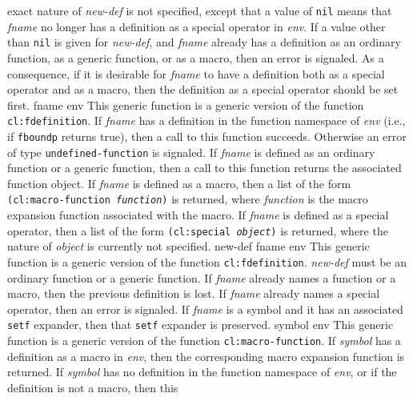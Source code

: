 exact nature of \textit{new-def} is not specified, except that a value
of \texttt{nil} means that \textit{fname} no longer has a definition
as a special operator in \textit{env}.
\vskip -0.02cm
If a value other than \texttt{nil} is given for \textit{new-def}, and
\textit{fname} already has a definition as an ordinary function, as a
generic function, or as a macro, then an error is signaled.  As a
consequence, if it is desirable for \textit{fname} to have a
definition both as a special operator and as a macro, then the
definition as a special operator should be set first.
\vskip -0.02cm
 {fname env}
\vskip -0.2cm
This generic function is a generic version of the \commonlisp{}
function \texttt{cl:fdefinition}.
\vskip -0.02cm
If \textit{fname} has a definition in the function namespace of
\textit{env} (i.e., if \texttt{fboundp} returns true), then a call to
this function succeeds.  Otherwise an error of type
\texttt{undefined-function} is signaled.
\vskip -0.02cm
If \textit{fname} is defined as an ordinary function or a generic
function, then a call to this function returns the associated
function object.
\vskip -0.02cm
If \textit{fname} is defined as a macro, then a list of the form
\texttt{(cl:macro-function \textrm{\textit{function}})} is returned, where
\textit{function} is the macro expansion function associated with the
macro.
\vskip -0.02cm
If \textit{fname} is defined as a special operator, then a list of the
form \texttt{(cl:special \textrm{\textit{object}})} is returned, where
  the nature of \textit{object} is currently not specified.
\vskip -0.02cm
 {new-def fname env}
\vskip -0.2cm
This generic function is a generic version of the \commonlisp{}
function \texttt{cl:fdefinition}.
\vskip -0.02cm
\textit{new-def} must be an ordinary function or a generic function.
If \textit{fname} already names a function or a macro, then the
previous definition is lost.  If \textit{fname} already names a
special operator, then an error is signaled.
\vskip -0.02cm
If \textit{fname} is a symbol and it has an associated \texttt{setf}
expander, then that \texttt{setf} expander is preserved.
\vskip -0.02cm
 {symbol env}
\vskip -0.2cm
This generic function is a generic version of the \commonlisp{}
function \texttt{cl:macro-function}.
\vskip -0.02cm
If \textit{symbol} has a definition as a macro in \textit{env}, then the
corresponding macro expansion function is returned.
\vskip -0.02cm
If \textit{symbol} has no definition in the function namespace of
\textit{env}, or if the definition is not a macro, then this
